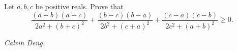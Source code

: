 Let $a,b,c$ be positive reals. Prove that
\[ \frac{(a-b)(a-c)}{2a^2 + (b+c)^2} + \frac{(b-c)(b-a)}{2b^2 + (c+a)^2} + \frac{(c-a)(c-b)}{2c^2 + (a+b)^2} \geq 0. \]

\textit{Calvin Deng.}